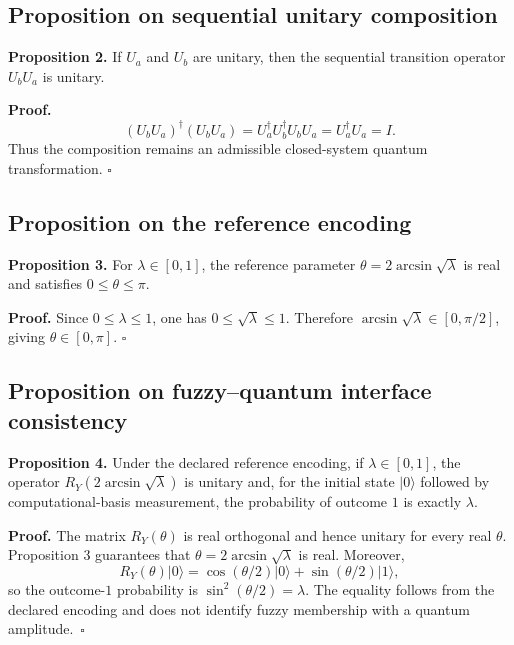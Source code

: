 \documentclass[final,3p,times]{elsarticle}
\begin{document}
\subsection{Proposition on sequential unitary composition}

\textbf{Proposition 2.} If $U_a$ and $U_b$ are unitary, then the sequential transition operator $U_bU_a$ is unitary.

\textbf{Proof.}
\begin{equation}
    (U_bU_a)^\dagger(U_bU_a)
    =U_a^\dagger U_b^\dagger U_bU_a
    =U_a^\dagger U_a
    =I.
\end{equation}
Thus the composition remains an admissible closed-system quantum transformation. $\square$

\subsection{Proposition on the reference encoding}

\textbf{Proposition 3.} For $\lambda\in[0,1]$, the reference parameter $\theta=2\arcsin\sqrt{\lambda}$ is real and satisfies $0\leq\theta\leq\pi$.

\textbf{Proof.} Since $0\leq\lambda\leq1$, one has $0\leq\sqrt{\lambda}\leq1$. Therefore $\arcsin\sqrt{\lambda}\in[0,\pi/2]$, giving $\theta\in[0,\pi]$. $\square$

\subsection{Proposition on fuzzy--quantum interface consistency}

\textbf{Proposition 4.} Under the declared reference encoding, if $\lambda\in[0,1]$, the operator $R_Y(2\arcsin\sqrt{\lambda})$ is unitary and, for the initial state $\lvert0\rangle$ followed by computational-basis measurement, the probability of outcome $1$ is exactly $\lambda$.

\textbf{Proof.} The matrix $R_Y(\theta)$ is real orthogonal and hence unitary for every real $\theta$. Proposition 3 guarantees that $\theta=2\arcsin\sqrt{\lambda}$ is real. Moreover,
\begin{equation}
    R_Y(\theta)\lvert0\rangle
    =\cos(\theta/2)\lvert0\rangle+\sin(\theta/2)\lvert1\rangle,
\end{equation}
so the outcome-$1$ probability is $\sin^2(\theta/2)=\lambda$. The equality follows from the declared encoding and does not identify fuzzy membership with a quantum amplitude.\ $\square$
\end{document}
